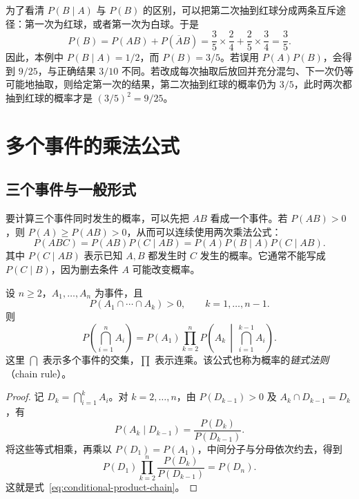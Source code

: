 \documentclass[UTF8,12pt,a4paper,fontset=fandol]{ctexart}
\begin{document}
为了看清 $P(B\mid A)$ 与 $P(B)$ 的区别，可以把第二次抽到红球分成两条互斥途径：第一次为红球，或者第一次为白球。于是
\[
  P(B)=P(AB)+P(\overline A B)
      =\frac35\times\frac24+\frac25\times\frac34
      =\frac35.
\]
因此，本例中 $P(B\mid A)=1/2$，而 $P(B)=3/5$。若误用 $P(A)P(B)$，会得到 $9/25$，与正确结果 $3/10$ 不同。若改成每次抽取后放回并充分混匀、下一次仍等可能地抽取，则给定第一次的结果，第二次抽到红球的概率仍为 $3/5$，此时两次都抽到红球的概率才是 $(3/5)^2=9/25$。

\section{多个事件的乘法公式}
\label{sec:conditional-product-chain}

\subsection{三个事件与一般形式}

要计算三个事件同时发生的概率，可以先把 $AB$ 看成一个事件。若 $P(AB)>0$，则 $P(A)\ge P(AB)>0$，从而可以连续使用两次乘法公式：
\begin{equation}
  P(ABC)=P(AB)P(C\mid AB)
        =P(A)P(B\mid A)P(C\mid AB).
  \label{eq:conditional-product-three}
\end{equation}
其中 $P(C\mid AB)$ 表示已知 $A,B$ 都发生时 $C$ 发生的概率。它通常不能写成 $P(C\mid B)$，因为删去条件 $A$ 可能改变概率。

\begin{theorem}[多个事件的乘法公式]
\label{thm:conditional-product-chain}
设 $n\ge2$，$A_1,\ldots,A_n$ 为事件，且
\[
  P(A_1\cap\cdots\cap A_k)>0,
  \qquad k=1,\ldots,n-1.
\]
则
\begin{equation}
  P\!\left(\bigcap_{i=1}^{n}A_i\right)
  =P(A_1)\prod_{k=2}^{n}
    P\!\left(A_k\,\middle|\,\bigcap_{i=1}^{k-1}A_i\right).
  \label{eq:conditional-product-chain}
\end{equation}
这里 $\bigcap$ 表示多个事件的交集，$\prod$ 表示连乘。该公式也称为概率的\emph{链式法则}（chain rule）。
\end{theorem}
\begin{proof}
记 $D_k=\bigcap_{i=1}^{k}A_i$。对 $k=2,\ldots,n$，由 $P(D_{k-1})>0$ 及 $A_k\cap D_{k-1}=D_k$，有
\[
  P(A_k\mid D_{k-1})=\frac{P(D_k)}{P(D_{k-1})}.
\]
将这些等式相乘，再乘以 $P(D_1)=P(A_1)$，中间分子与分母依次约去，得到
\[
  P(D_1)\prod_{k=2}^{n}\frac{P(D_k)}{P(D_{k-1})}
  =P(D_n).
\]
这就是式~\eqref{eq:conditional-product-chain}。
\end{proof}
\end{document}
